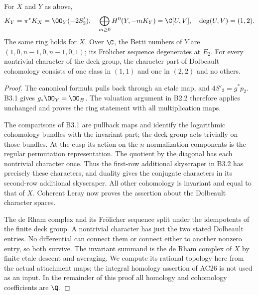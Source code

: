 \begin{proposition}\label{inv:B3.3}
For $X$ and $Y$ as above,
\[
K_Y=\pi^*K_X=\OO_Y(-2S'_2),\quad
\bigoplus_{m\ge0}H^0(Y,-mK_Y)=\C[U,V],\quad
\deg(U,V)=(1,2).
\]
The same ring holds for $X$.
Over $\C$, the Betti numbers of $Y$ are
$(1,0,n-1,0,n-1,0,1)$; its Fr\"olicher sequence degenerates at $E_2$.
For every nontrivial character of the deck group, the character
part of Dolbeault cohomology consists of one class in $(1,1)$ and
one in $(2,2)$ and no others.
\end{proposition}
\begin{proof}
The canonical formula pulls back through an etale map, and
$4S'_2=g^*p_2$. B3.1 gives $g_*\OO_Y=\OO_B$.
The valuation argument in B2.2 therefore applies unchanged and proves
the ring statement with all multiplication maps.

The comparisons of B3.1 are pullback maps and identify the logarithmic
cohomology bundles with the invariant part; the deck group acts
trivially on those bundles. At the cusp its action on the $n$
normalization components is the regular permutation representation.
The quotient by the diagonal has each nontrivial character once.
Thus the first-row additional skyscraper in B3.2 has precisely these
characters, and duality gives the conjugate characters in its
second-row additional skyscraper. All other cohomology is invariant
and equal to that of $X$. Coherent Leray now proves the assertion
about the Dolbeault character spaces.

The de Rham complex and its Fr\"olicher sequence split under the
idempotents of the finite deck group. A nontrivial character has just
the two stated Dolbeault entries. No differential can connect them
or connect either to another nonzero entry, so both survive.
The invariant summand is the de Rham complex of $X$ by finite
etale descent and averaging. We compute its rational topology here
from the actual attachment maps; the integral homology assertion
of AC26 is not used as an input. In the remainder of this proof
all homology and cohomology coefficients are $\Q$.


\end{proof}
